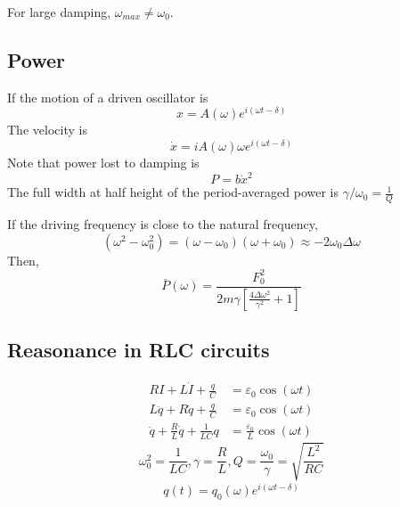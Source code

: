 \documentclass[a4paper]{article}
\numberwithin{equation}{section}
\begin{document}
For large damping, $\omega_{max}\neq\omega_0$.

\subsection{Power}

If the motion of a driven oscillator is
\begin{equation}
    x=A(\omega)e^{i(\omega t-\delta)}
\end{equation}
The velocity is 
\begin{equation}
    \dot x=iA(\omega)\omega e^{i(\omega t-\delta)}
\end{equation}
Note that power lost to damping is 
\begin{equation}
    P=b\dot x^2
\end{equation}
The full width at half height of the period-averaged power is $\gamma/\omega_0=\frac{1}{Q}$
\begin{center}
\end{center}

If the driving frequency is close to the natural frequency, 
\begin{equation}
    (\omega^2-\omega_0^2)=(\omega-\omega_0)(\omega+\omega_0)\approx -2\omega_0\Delta\omega
\end{equation}
Then, 
\begin{equation}
    \overline P(\omega)=\frac{F_0^2}{2m\gamma[\frac{4\Delta\omega^2}{\gamma^2}+1]}
\end{equation}
\subsection{Reasonance in RLC circuits}
\begin{align}
    RI+L\dot I+\frac{q}{C}&=\varepsilon_0\cos(\omega t)\\
    L\ddot q+R\dot q+\frac{q}{C}&=\varepsilon_0\cos(\omega t)\\
    \ddot q+\frac{R}{L}\dot q+\frac{1}{LC}q&=\frac{\varepsilon_0}{L}\cos(\omega t)
\end{align}
$$\omega_0^2=\frac{1}{LC},\gamma=\frac{R}{L},Q=\frac{\omega_0}{\gamma}=\sqrt{\frac{L^2}{RC}}$$
\begin{align}
    q(t)=q_0(\omega)e^{i(\omega t-\delta)}
\end{align}
\end{document}
